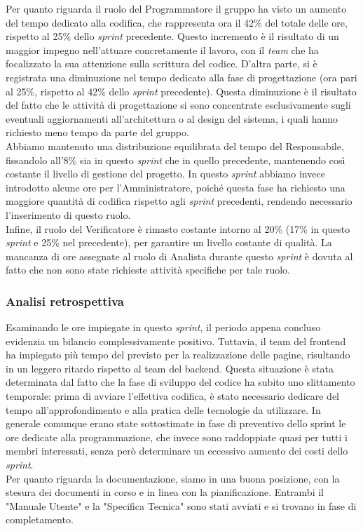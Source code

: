Per quanto riguarda il ruolo del Programmatore il gruppo ha visto un aumento del tempo dedicato alla codifica, che rappresenta ora il 42\% del totale delle ore, 
rispetto al 25\% dello \textit{sprint} precedente. Questo incremento è il risultato di un maggior impegno nell'attuare concretamente il lavoro, con il \textit{team} che ha focalizzato la sua attenzione sulla scrittura del codice.
D'altra parte, si è registrata una diminuzione nel tempo dedicato alla fase di progettazione (ora pari al 25\%, rispetto al 42\% dello \textit{sprint} precedente). Questa diminuzione è il risultato del fatto che le attività di progettazione si sono concentrate esclusivamente sugli eventuali aggiornamenti all'architettura o al design del sistema, i quali hanno richiesto meno tempo da parte del gruppo. \\
Abbiamo mantenuto una distribuzione equilibrata del tempo del Responsabile, fissandolo all'8\% sia in questo \textit{sprint} che in quello precedente, mantenendo così costante il livello di gestione del progetto.
In questo \textit{sprint} abbiamo invece introdotto alcune ore per l'Amministratore, poiché questa fase ha richiesto una maggiore quantità di codifica rispetto agli \textit{sprint} precedenti, rendendo necessario l'inserimento di questo ruolo.\\
Infine, il ruolo del Verificatore è rimasto costante intorno al 20\% (17\% in questo \textit{sprint} e 25\% nel precedente), per garantire un livello costante di qualità.
La mancanza di ore assegnate al ruolo di Analista durante questo \textit{sprint} è dovuta al fatto che non sono state richieste attività specifiche per tale ruolo.

\subsubsection{Analisi retrospettiva}
Esaminando le ore impiegate in questo \textit{sprint}, il periodo appena concluso evidenzia un bilancio complessivamente positivo. Tuttavia, il team del frontend ha impiegato più tempo del previsto per la realizzazione delle pagine, risultando in un leggero ritardo rispetto al team del backend. Questa situazione è stata determinata dal fatto che la fase di sviluppo del codice ha subito uno slittamento temporale: prima di avviare l'effettiva codifica, è stato necessario dedicare del tempo all'approfondimento e alla pratica delle tecnologie da utilizzare. In generale comunque erano state sottostimate in fase di preventivo dello sprint le ore dedicate alla programmazione, che invece sono raddoppiate quasi per tutti i membri interessati, senza però determinare un eccessivo aumento dei costi dello \textit{sprint}.\\
Per quanto riguarda la documentazione, siamo in una buona posizione, con la stesura dei documenti in corso e in linea con la pianificazione. Entrambi il "Manuale Utente" e la "Specifica Tecnica" sono stati avviati e si trovano in fase di completamento.

